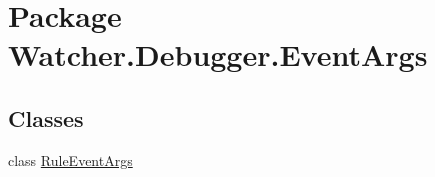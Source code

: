 \hypertarget{namespace_watcher_1_1_debugger_1_1_event_args}{\section{Package Watcher.\+Debugger.\+Event\+Args}
\label{namespace_watcher_1_1_debugger_1_1_event_args}
}
\subsection*{Classes}
\begin{DoxyCompactItemize}
\item 
class \hyperlink{class_watcher_1_1_debugger_1_1_event_args_1_1_rule_event_args}{Rule\+Event\+Args}
\end{DoxyCompactItemize}
